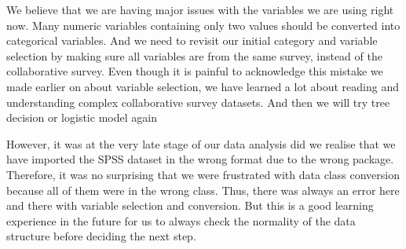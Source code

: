 \documentclass[]{article}
\newenvironment{Shaded}{\begin{snugshade}}{\end{snugshade}}
\newcommand{\KeywordTok}[1]{\textcolor[rgb]{0.13,0.29,0.53}{\textbf{#1}}}
\newcommand{\DecValTok}[1]{\textcolor[rgb]{0.00,0.00,0.81}{#1}}
\newcommand{\FloatTok}[1]{\textcolor[rgb]{0.00,0.00,0.81}{#1}}
\newcommand{\StringTok}[1]{\textcolor[rgb]{0.31,0.60,0.02}{#1}}
\newcommand{\CommentTok}[1]{\textcolor[rgb]{0.56,0.35,0.01}{\textit{#1}}}
\newcommand{\OtherTok}[1]{\textcolor[rgb]{0.56,0.35,0.01}{#1}}
\newcommand{\OperatorTok}[1]{\textcolor[rgb]{0.81,0.36,0.00}{\textbf{#1}}}
\newcommand{\NormalTok}[1]{#1}
\begin{document}
We believe that we are having major issues with the variables we are
using right now. Many numeric variables containing only two values
should be converted into categorical variables. And we need to revisit
our initial category and variable selection by making sure all variables
are from the same survey, instead of the collaborative survey. Even
though it is painful to acknowledge this mistake we made earlier on
about variable selection, we have learned a lot about reading and
understanding complex collaborative survey datasets. And then we will
try tree decision or logistic model again

However, it was at the very late stage of our data analysis did we
realise that we have imported the SPSS dataset in the wrong format due
to the wrong package. Therefore, it was no surprising that we were
frustrated with data class conversion because all of them were in the
wrong class. Thus, there was always an error here and there with
variable selection and conversion. But this is a good learning
experience in the future for us to always check the normality of the
data structure before deciding the next step.

\begin{Shaded}
\end{Shaded}

\begin{Shaded}
\end{Shaded}
\end{document}

